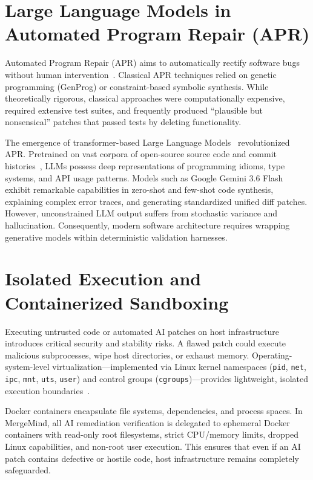 \documentclass[12pt,a4paper,oneside]{report}
\begin{document}
\section{Large Language Models in Automated Program Repair (APR)}
\label{sec:lit-apr-llm}

Automated Program Repair (APR) aims to automatically rectify software bugs without human intervention~\cite{legoues2019automated}. Classical APR techniques relied on genetic programming (GenProg) or constraint-based symbolic synthesis. While theoretically rigorous, classical approaches were computationally expensive, required extensive test suites, and frequently produced ``plausible but nonsensical'' patches that passed tests by deleting functionality.

The emergence of transformer-based Large Language Models~\cite{vaswani2017attention} revolutionized APR. Pretrained on vast corpora of open-source source code and commit histories~\cite{chen2021evaluating}, LLMs possess deep representations of programming idioms, type systems, and API usage patterns. Models such as Google Gemini 3.6 Flash~\cite{deepmind2023gemini} exhibit remarkable capabilities in zero-shot and few-shot code synthesis, explaining complex error traces, and generating standardized unified diff patches. However, unconstrained LLM output suffers from stochastic variance and hallucination. Consequently, modern software architecture requires wrapping generative models within deterministic validation harnesses.

\section{Isolated Execution and Containerized Sandboxing}
\label{sec:lit-sandbox}

Executing untrusted code or automated AI patches on host infrastructure introduces critical security and stability risks. A flawed patch could execute malicious subprocesses, wipe host directories, or exhaust memory. Operating-system-level virtualization---implemented via Linux kernel namespaces (\texttt{pid}, \texttt{net}, \texttt{ipc}, \texttt{mnt}, \texttt{uts}, \texttt{user}) and control groups (\texttt{cgroups})---provides lightweight, isolated execution boundaries~\cite{merkel2014docker}.

Docker containers encapsulate file systems, dependencies, and process spaces. In MergeMind, all AI remediation verification is delegated to ephemeral Docker containers with read-only root filesystems, strict CPU/memory limits, dropped Linux capabilities, and non-root user execution. This ensures that even if an AI patch contains defective or hostile code, host infrastructure remains completely safeguarded.
\end{document}
